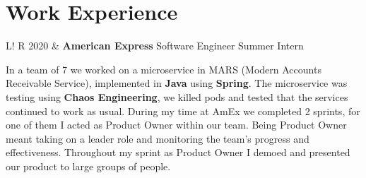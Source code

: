 \documentclass[10pt, a4paper]{article}
\newcommand\vsep{\color{lightgray} \vrule width 0.5pt}
\newcommand\sect[1]{\section*{\hspace{.05cm} \Large\sc #1}}
\newcommand\tspace{\hfill}
\begin{document}
        \sect{Work Experience}
            \begin{tabular}{L!{\vsep}R}
                2020 & {\textbf{American Express}} \tspace Software Engineer Summer Intern 
                    \smallskip

                    In a team of 7 we worked on a microservice in MARS (Modern Accounts Receivable Service), implemented in \textbf{Java} using \textbf{Spring}. The microservice was testing using \textbf{Chaos Engineering}, we killed pods and tested that the services continued to work as usual. During my time at AmEx we completed 2 sprints, for one of them I acted as Product Owner within our team. Being Product Owner meant taking on a leader role and monitoring the team's progress and effectiveness. Throughout my sprint as Product Owner I demoed and presented our product to large groups of people.
                    \smallskip
            \end{tabular}
            \vspace{0.5\baselineskip}
\end{document}
